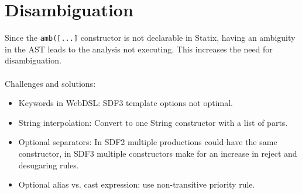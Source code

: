   \section{\label{sec:webdsl-sdf3-disambiguation}Disambiguation}
  
    Since the \texttt{amb([...]} constructor is not declarable in Statix, having an ambiguity in the AST leads to the analysis not executing. This increases the need for disambiguation.
    \\\\Challenges and solutions:
    \begin{itemize}
      \item Keywords in WebDSL: SDF3 template options not optimal.
      \item String interpolation: Convert to one String constructor with a list of parts.
      \item Optional separators: In SDF2 multiple productions could have the same constructor, in SDF3 multiple constructors make for an increase in reject and desugaring rules.
      \item Optional alias vs. cast expression: use non-transitive priority rule.
    \end{itemize}
